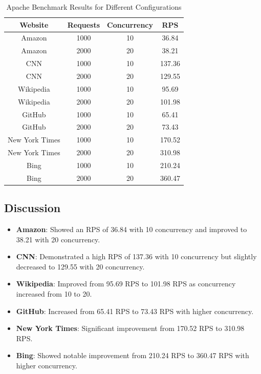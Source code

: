 \documentclass[a4paper,10pt]{article}
\begin{document}
\begin{table}[ht]
\centering
\begin{tabular}{|c|c|c|c|}
\hline
\textbf{Website} & \textbf{Requests} & \textbf{Concurrency} & \textbf{RPS} \\
\hline
Amazon & 1000 & 10 & 36.84 \\
Amazon & 2000 & 20 & 38.21 \\
CNN & 1000 & 10 & 137.36 \\
CNN & 2000 & 20 & 129.55 \\
Wikipedia & 1000 & 10 & 95.69 \\
Wikipedia & 2000 & 20 & 101.98 \\
GitHub & 1000 & 10 & 65.41 \\
GitHub & 2000 & 20 & 73.43 \\
New York Times & 1000 & 10 & 170.52 \\
New York Times & 2000 & 20 & 310.98 \\
Bing & 1000 & 10 & 210.24 \\
Bing & 2000 & 20 & 360.47 \\
\hline
\end{tabular}
\caption{Apache Benchmark Results for Different Configurations}
\label{tab:apache_benchmark_results}
\end{table}

\subsection{Discussion}

\begin{itemize}
    \item \textbf{Amazon}: Showed an RPS of 36.84 with 10 concurrency and improved to 38.21 with 20 concurrency.
    \item \textbf{CNN}: Demonstrated a high RPS of 137.36 with 10 concurrency but slightly decreased to 129.55 with 20 concurrency.
    \item \textbf{Wikipedia}: Improved from 95.69 RPS to 101.98 RPS as concurrency increased from 10 to 20.
    \item \textbf{GitHub}: Increased from 65.41 RPS to 73.43 RPS with higher concurrency.
    \item \textbf{New York Times}: Significant improvement from 170.52 RPS to 310.98 RPS.
    \item \textbf{Bing}: Showed notable improvement from 210.24 RPS to 360.47 RPS with higher concurrency.
\end{itemize}
\end{document}
